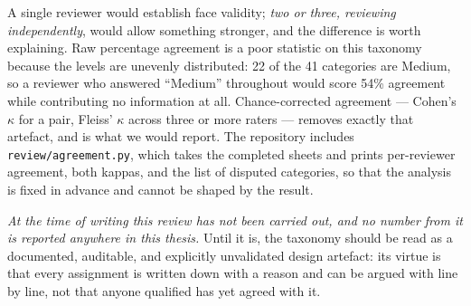 A single reviewer would establish face validity; \emph{two or three, reviewing independently}, would allow something stronger, and the difference is worth explaining. Raw percentage agreement is a poor statistic on this taxonomy because the levels are unevenly distributed: 22 of the 41 categories are Medium, so a reviewer who answered ``Medium'' throughout would score 54\% agreement while contributing no information at all. Chance-corrected agreement --- Cohen's $\kappa$ for a pair, Fleiss' $\kappa$ across three or more raters --- removes exactly that artefact, and is what we would report. The repository includes \texttt{review/agreement.py}, which takes the completed sheets and prints per-reviewer agreement, both kappas, and the list of disputed categories, so that the analysis is fixed in advance and cannot be shaped by the result.

\emph{At the time of writing this review has not been carried out, and no number from it is reported anywhere in this thesis.} Until it is, the taxonomy should be read as a documented, auditable, and explicitly unvalidated design artefact: its virtue is that every assignment is written down with a reason and can be argued with line by line, not that anyone qualified has yet agreed with it.

